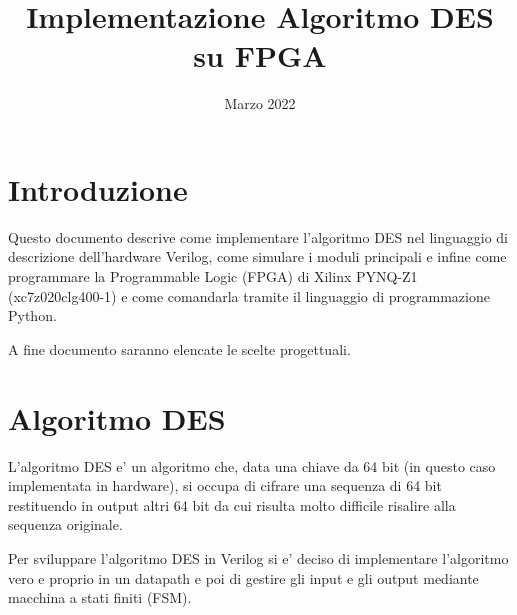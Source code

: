 \documentclass[a4paper]{article}
\title{Implementazione Algoritmo DES su FPGA}
\date{Marzo 2022}
\begin{document}
\begin{titlepage}
\maketitle
\end{titlepage}

\tableofcontents
\clearpage

\section{Introduzione}
Questo documento descrive come implementare l'algoritmo DES nel linguaggio di descrizione dell'hardware Verilog,
come simulare i moduli principali e infine come programmare la Programmable Logic (FPGA) di Xilinx PYNQ-Z1 (xc7z020clg400-1) 
e come comandarla tramite il linguaggio di programmazione Python.

A fine documento saranno elencate le scelte progettuali.


\section{Algoritmo DES}
L'algoritmo DES e' un algoritmo che, data una chiave da 64 bit (in questo caso implementata in hardware), 
si occupa di cifrare una sequenza di 64 bit restituendo in output altri 64 bit da cui risulta molto difficile risalire alla sequenza originale.

Per sviluppare l'algoritmo DES in Verilog si e' deciso di implementare l'algoritmo vero e proprio in un datapath e poi di gestire gli input e gli output mediante macchina a stati finiti (FSM).
\end{document}
